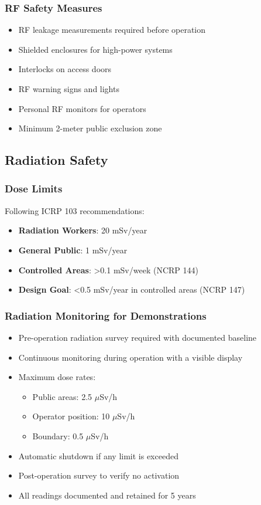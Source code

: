 \subsubsection{RF Safety Measures}
\begin{itemize}[noitemsep]
    \item RF leakage measurements required before operation
    \item Shielded enclosures for high-power systems
    \item Interlocks on access doors
    \item RF warning signs and lights
    \item Personal RF monitors for operators
    \item Minimum 2-meter public exclusion zone
\end{itemize}

\subsection{Radiation Safety}

\subsubsection{Dose Limits}
Following ICRP 103 recommendations:
\begin{itemize}[noitemsep]
    \item \textbf{Radiation Workers}: 20 mSv/year
    \item \textbf{General Public}: 1 mSv/year
    \item \textbf{Controlled Areas}: >0.1 mSv/week (NCRP 144)
    \item \textbf{Design Goal}: <0.5 mSv/year in controlled areas (NCRP 147)
\end{itemize}

\subsubsection{Radiation Monitoring for Demonstrations}
\begin{itemize}
    \item Pre-operation radiation survey required with documented baseline
    \item Continuous monitoring during operation with a visible display
    \item Maximum dose rates:
    \begin{itemize}
        \item Public areas: 2.5 $\mu$Sv/h
        \item Operator position: 10 $\mu$Sv/h
        \item Boundary: 0.5 $\mu$Sv/h
    \end{itemize}
    \item Automatic shutdown if any limit is exceeded
    \item Post-operation survey to verify no activation
    \item All readings documented and retained for 5 years
\end{itemize}

